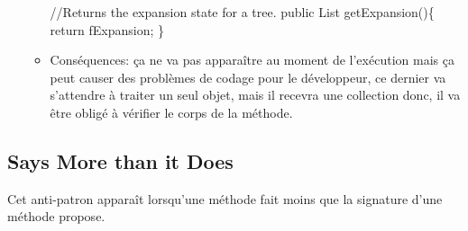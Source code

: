 \begin{enumerate}
\begin{itemize}
\begin{framed}
{\selectfont
//Returns the expansion state for a tree.\newline
public List getExpansion()\{ return fExpansion; \}
}
\end{framed}
\item Conséquences: ça ne va pas apparaître au moment de l’exécution mais ça peut causer des problèmes de codage pour le développeur, ce dernier va s’attendre à traiter un seul objet, mais il recevra une collection donc, il va être obligé à vérifier le corps de la méthode.

\end{itemize}

\end{enumerate}
\subsection{Says More than it Does}
Cet anti-patron apparaît lorsqu'une méthode fait moins que la signature d'une méthode propose\cite{arnaoudova2013new}.
